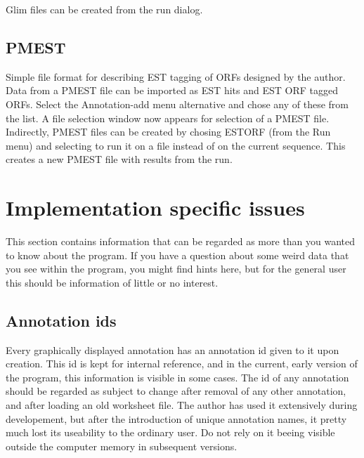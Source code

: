Glim files can be created from the run dialog.

\subsection{PMEST}
Simple file format for describing EST tagging of ORFs designed by the
author.  Data from a PMEST file can be imported as EST hits and EST
ORF tagged ORFs. Select the Annotation-add menu alternative and chose
any of these from the list. A file selection window now appears for
selection of a PMEST file.  Indirectly, PMEST files can be created by
chosing ESTORF (from the Run menu) and selecting to run it on a file
instead of on the current sequence. This creates a new PMEST file with
results from the run.

\section{Implementation specific issues}
This section contains information that can be regarded as more than
you wanted to know about the program. If you have a question about
some weird data that you see within the program, you might find hints
here, but for the general user this should be information of little or
no interest.

\subsection{Annotation ids}
Every graphically displayed annotation has an annotation id given to
it upon creation. This id is kept for internal reference, and in the
current, early version of the program, this information is visible in
some cases. The id of any annotation should be regarded as subject to
change after removal of any other annotation, and after loading an old
worksheet file. The author has used it extensively during
developement, but after the introduction of unique annotation names,
it pretty much lost its useability to the ordinary user. Do not rely
on it beeing visible outside the computer memory in subsequent
versions.

